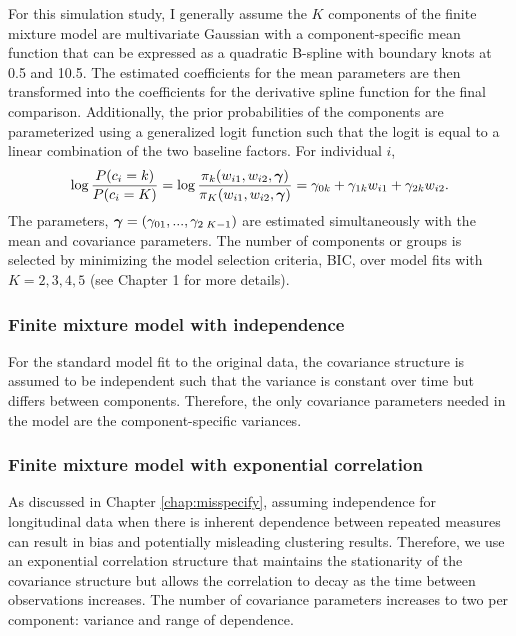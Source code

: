For this simulation study, I generally assume the $K$ components of the finite mixture model are multivariate Gaussian with a component-specific mean function that can be expressed as a quadratic B-spline with boundary knots at 0.5 and 10.5. The estimated coefficients for the mean parameters are then transformed into the coefficients for the derivative spline function for the final comparison. Additionally, the prior probabilities of the components are parameterized using a generalized logit function such that the logit is equal to a linear combination of the two baseline factors. For individual $i$, 
$$\log\frac{P(c_{i}=k)}{P(c_{i}=K)} = \log\frac{\pi_{k}(w_{i1},w_{i2},\boldsymbol\gamma)}{\pi_{K}(w_{i1},w_{i2},\boldsymbol\gamma)} =  \gamma_{0k}+\gamma_{1k}w_{i1}+\gamma_{2k}w_{i2}.$$
The parameters, $\boldsymbol\gamma=(\gamma_{01},...,\gamma_{2\; K-1})$ are estimated simultaneously with the mean and covariance parameters. 
The number of components or groups is selected by minimizing the model selection criteria, BIC, over model fits with $K=2,3,4,5$ (see Chapter 1 for more details). 

\subsubsection{Finite mixture model with independence}
For the standard model fit to the original data, the covariance structure is assumed to be independent such that the variance is constant over time but differs between components. Therefore, the only covariance parameters needed in the model are the component-specific variances.

\subsubsection{Finite mixture model with exponential correlation}
As discussed in Chapter \ref{chap:misspecify}, assuming independence for longitudinal data when there is inherent dependence between repeated measures can result in bias and potentially misleading clustering results. Therefore, we use an exponential correlation structure that maintains the stationarity of the covariance structure but allows the correlation to decay as the time between observations increases. The number of covariance parameters increases to two per component: variance and range of dependence. 

